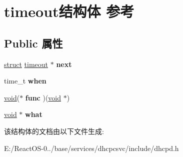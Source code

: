\hypertarget{structtimeout}{}\section{timeout结构体 参考}
\label{structtimeout}
\subsection*{Public 属性}
\begin{DoxyCompactItemize}
\item 
\mbox{\label{structtimeout_aad3fd98a9707d7ad1374cb184be877e6}} 
\hyperlink{interfacestruct}{struct} \hyperlink{structtimeout}{timeout} $\ast$ {\bfseries next}
\item 
\mbox{\label{structtimeout_aa2e9efb5316a1d5ae438d1750c872645}} 
time\+\_\+t {\bfseries when}
\item 
\mbox{\label{structtimeout_a08444df7488edb90163e87b22a6015b5}} 
\hyperlink{interfacevoid}{void}($\ast$ {\bfseries func} )(\hyperlink{interfacevoid}{void} $\ast$)
\item 
\mbox{\label{structtimeout_a9e80ddf5792fd48f9cb1db068bd1449d}} 
\hyperlink{interfacevoid}{void} $\ast$ {\bfseries what}
\end{DoxyCompactItemize}


该结构体的文档由以下文件生成\+:\begin{DoxyCompactItemize}
\item 
E\+:/\+React\+O\+S-\/0../base/services/dhcpcsvc/include/dhcpd.\+h\end{DoxyCompactItemize}
